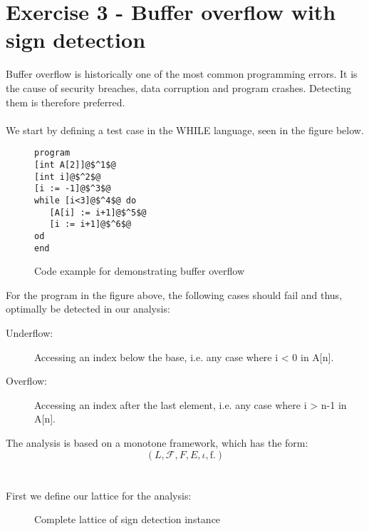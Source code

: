\section{Exercise 3 - Buffer overflow with sign detection} \label{sec:exercise3}
Buffer overflow is historically one of the most common programming errors. It is the cause of security breaches, data corruption and program crashes. Detecting them is therefore preferred.\\\\
We start by defining a test case in the WHILE language, seen in the figure below.
\begin{figure}[H]
  \begin{lstlisting}
program
[int A[2]]@$^1$@
[int i]@$^2$@
[i := -1]@$^3$@
while [i<3]@$^4$@ do
   [A[i] := i+1]@$^5$@
   [i := i+1]@$^6$@
od
end
 \end{lstlisting}
 \label{code:array_example}
 \caption{Code example for demonstrating buffer overflow}
\end{figure}
\noindent For the program in the figure above, the following cases should fail and thus, optimally be detected in our analysis:
\begin{description}
\item[Underflow:] Accessing an index below the base, i.e. any case where i < 0 in A[n].
\item[Overflow:] Accessing an index after the last element, i.e. any case where i > n-1 in A[n].
\end{description}
The analysis is based on a monotone framework, which has the form:
\begin{equation}
  \left(L, \mathcal{F}, F, E, \iota, \mathrm{f}.  \right)
  \label{eq:monotone_framework}
\end{equation}
\\\\
First we define our lattice for the analysis:
 \begin{figure}[h]
 \centering
  \caption{Complete lattice of sign detection instance}
 
  \label{fig:sign_detection_complete_lattice}
 \end{figure}

